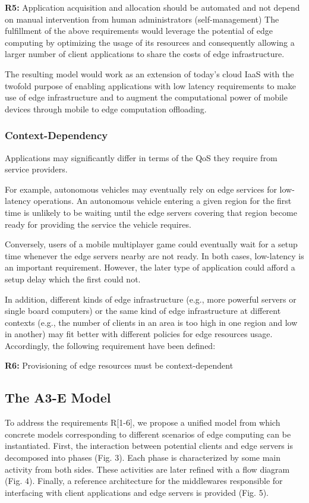 \textbf{R5:} Application acquisition and allocation should be automated and not depend on  manual intervention from human administrators (self-management)
The fulfillment of the above requirements would leverage the potential of edge computing by optimizing the usage of its resources and consequently allowing a larger number of client applications to share the costs of edge infrastructure.

The resulting model would work as an extension of today’s cloud IaaS with the twofold purpose of enabling applications with low latency requirements to make use of edge infrastructure and to augment the computational power of mobile devices through mobile to edge computation offloading. 

\subsubsection{Context-Dependency }

Applications may significantly differ in terms of the QoS they require from service providers. 

For example, autonomous vehicles may eventually rely on edge services for low-latency operations. An autonomous vehicle entering a given region for the first time is unlikely to be waiting until the edge servers covering that region become ready for providing the service the vehicle requires. 

Conversely, users of a mobile multiplayer game could eventually wait for a setup time whenever the edge servers nearby are not ready. In both cases, low-latency is an important requirement. However, the later type of application could afford a setup delay which the first could not. 

In addition, different kinds of edge infrastructure (e.g., more powerful servers or single board computers) or the same kind of edge infrastructure at different contexts (e.g., the number of clients in an area is too high in one region and low in another) may fit better with different policies for edge resources usage. Accordingly, the following requirement have been defined:

\textbf{R6:} Provisioning of edge resources must be context-dependent

\subsection{The A3-E Model}

To address the requirements R[1-6], we propose a unified model from which concrete models corresponding to different scenarios of edge computing can be instantiated. 
First, the interaction between potential clients and edge servers is decomposed into phases (Fig. 3). Each phase is characterized by some main activity from both sides. These activities are later refined with a flow diagram (Fig. 4). Finally, a reference architecture for the middlewares responsible for interfacing with client applications and edge servers is provided (Fig. 5).

